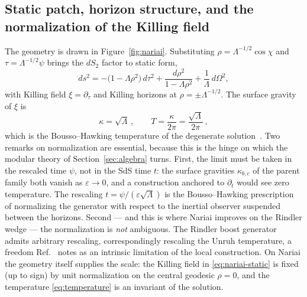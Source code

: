 \documentclass[11pt]{article}
\newcommand{\Nariai}{Nariai}
\begin{document}
\subsection{Static patch, horizon structure, and the normalization of the Killing field}
The geometry is drawn in Figure~\ref{fig:nariai}. 
Substituting $\rho = \Lambda^{-1/2}\cos\chi$ and $\tau = \Lambda^{-1/2}\psi$ brings the $dS_2$ factor to static form,
\begin{equation}
ds^2 = -\big(1-\Lambda\rho^2\big)\,d\tau^2 + \frac{d\rho^2}{1-\Lambda\rho^2} + \frac{1}{\Lambda}\,d\Omega^2 ,
\label{eq:nariai-static}
\end{equation}
with Killing field $\xi = \partial_\tau$ and Killing horizons at $\rho = \pm \Lambda^{-1/2}$. The surface gravity of $\xi$ is
\begin{equation}
\kappa = \sqrt{\Lambda}\,,
\qquad
T = \frac{\kappa}{2\pi} = \frac{\sqrt{\Lambda}}{2\pi}\,,
\label{eq:temperature}
\end{equation}
which is the Bousso--Hawking temperature of the degenerate solution~\cite{BoussoHawking}. Two remarks on normalization are essential, because this is the hinge on which the modular theory of Section~\ref{sec:algebra} turns. First, the limit must be taken in the rescaled time $\psi$, not in the SdS time $t$: the surface gravities $\kappa_{b,c}$ of the parent family both vanish as $\varepsilon \to 0$, and a construction anchored to $\partial_t$ would see zero temperature. The rescaling $t = \psi/(\varepsilon\sqrt{\Lambda})$ is the Bousso--Hawking prescription of normalizing the generator with respect to the inertial observer suspended between the horizons. Second --- and this is where \Nariai{} improves on the Rindler wedge --- the normalization is \emph{not} ambiguous. The Rindler boost generator admits arbitrary rescaling, correspondingly rescaling the Unruh temperature, a freedom Ref.~\cite{DorauMuch} notes as an intrinsic limitation of the local construction. On \Nariai{} the geometry itself supplies the scale: the Killing field in \eqref{eq:nariai-static} is fixed (up to sign) by unit normalization on the central geodesic $\rho = 0$, and the temperature \eqref{eq:temperature} is an invariant of the solution.
\end{document}

